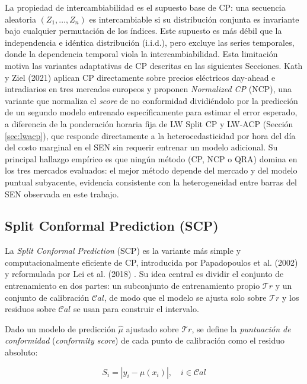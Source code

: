 La propiedad de intercambiabilidad es el supuesto base de CP: una secuencia aleatoria $(Z_1, \ldots, Z_n)$ es intercambiable si su distribución conjunta es invariante bajo cualquier permutación de los índices. Este supuesto es más débil que la independencia e idéntica distribución (i.i.d.), pero excluye las series temporales, donde la dependencia temporal viola la intercambiabilidad. Esta limitación motiva las variantes adaptativas de CP descritas en las siguientes Secciones. Kath y Ziel (2021) \cite{KathZiel2021} aplican CP directamente sobre precios eléctricos day-ahead e intradiarios en tres mercados europeos y proponen \textit{Normalized CP} (NCP), una variante que normaliza el \textit{score} de no conformidad dividiéndolo por la predicción de un segundo modelo entrenado específicamente para estimar el error esperado, a diferencia de la ponderación horaria fija de LW Split CP y LW-ACP (Sección \ref{sec:lwacp}), que responde directamente a la heterocedasticidad por hora del día del costo marginal en el SEN sin requerir entrenar un modelo adicional. Su principal hallazgo empírico es que ningún método (CP, NCP o QRA) domina en los tres mercados evaluados: el mejor método depende del mercado y del modelo puntual subyacente, evidencia consistente con la heterogeneidad entre barras del SEN observada en este trabajo.

\subsection{Split Conformal Prediction (SCP)}

La \textit{Split Conformal Prediction} (SCP) es la variante más simple y computacionalmente eficiente de CP, introducida por Papadopoulos et al. (2002) \cite{Papadopoulos2002} y reformulada por Lei et al. (2018) \cite{LeiCP}. Su idea central es dividir el conjunto de entrenamiento en dos partes: un subconjunto de entrenamiento propio $\mathcal{T}r$ y un conjunto de calibración $\mathcal{C}al$, de modo que el modelo se ajusta solo sobre $\mathcal{T}r$ y los residuos sobre $\mathcal{C}al$ se usan para construir el intervalo.

Dado un modelo de predicción $\hat{\mu}$ ajustado sobre $\mathcal{T}r$, se define la \textit{puntuación de conformidad} (\textit{conformity score}) de cada punto de calibración como el residuo absoluto:

\begin{equation}
    S_i = \left|y_i - \hat{\mu}(x_i)\right|, \quad i \in \mathcal{C}al
    \label{eq:conformity_score}
\end{equation}

